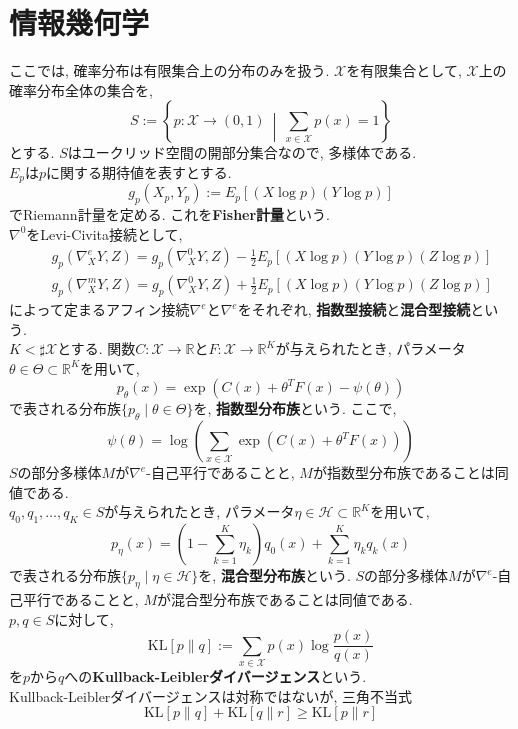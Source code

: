 \documentclass{jarticle}
\theoremstyle{definition}
\begin{document}
\section{情報幾何学}
   ここでは, 確率分布は有限集合上の分布のみを扱う. 
   $\mathcal{X}$を有限集合として, 
   $\mathcal{X}$上の確率分布全体の集合を, 
   \[
   		S:=\left\{ p:\mathcal{X}\to (0,1)\ \middle|\  \sum_{x\in\mathcal{X}}p(x)=1  \right\}
   \]
   とする. $S$はユークリッド空間の開部分集合なので, 多様体である.\\
   $E_p$は$p$に関する期待値を表すとする.
   \[
   		g_p(X_p,Y_p):=E_p[(X \log p)(Y \log p)]	
   \]
   でRiemann計量を定める. これを{\bf Fisher計量}という. \\
   $\nabla^0$をLevi-Civita接続として, 
   \begin{eqnarray*}
   		& & g_p(\nabla_X^e Y,Z)=g_p(\nabla_X^0 Y,Z)-\frac{1}{2}E_p[(X \log p)(Y \log p)(Z \log p)]\\
        & & g_p(\nabla_X^m Y,Z)=g_p(\nabla_X^0 Y,Z)+\frac{1}{2}E_p[(X \log p)(Y \log p)(Z \log p)]
   \end{eqnarray*}
   によって定まるアフィン接続$\nabla^e$と$\nabla^e$をそれぞれ, 
   {\bf 指数型接続}と{\bf 混合型接続}という. \\
   $K<\sharp\mathcal{X}$とする. 
   関数$C:\mathcal{X}\to\mathbb{R}$と$F:\mathcal{X}\to\mathbb{R}^K$が与えられたとき, 
   パラメータ$\theta\in\Theta\subset\mathbb{R}^K$を用いて, 
   \[
   		p_\theta(x) = \exp(C(x)+\theta^T F(x)-\psi(\theta))
   \]
   で表される分布族$\{ p_\theta \mid \theta\in\Theta \}$を, 
   {\bf 指数型分布族}という. ここで, 
   \[
   		\psi(\theta)=\log\left( \sum_{x\in\mathcal{X}} \exp(C(x)+\theta^T F(x)) \right)
   \]
   $S$の部分多様体$M$が$\nabla^e$-自己平行であることと, 
   $M$が指数型分布族であることは同値である.\\
   $q_0,q_1,\dots,q_K \in S$が与えられたとき, 
   パラメータ$\eta\in \mathcal{H}\subset\mathbb{R}^K$を用いて, 
   \[
   		p_\eta(x)=\left( 1-\sum_{k=1}^K \eta_k \right)q_0(x) + \sum_{k=1}^K \eta_k q_k(x)
   \]
   で表される分布族$\{ p_\eta \mid \eta\in\mathcal{H} \}$を, 
   {\bf 混合型分布族}という. 
   $S$の部分多様体$M$が$\nabla^e$-自己平行であることと, 
   $M$が混合型分布族であることは同値である.\\
   $p,q\in S$に対して, 
   \[
   		\text{KL}[p\|q]:=\sum_{x\in\mathcal{X}}p(x)\log\frac{p(x)}{q(x)}
   \]
   を$p$から$q$への{\bf Kullback-Leiblerダイバージェンス}という. \\
   Kullback-Leiblerダイバージェンスは対称ではないが, 三角不当式
   \[
   		\text{KL}[p\|q]+\text{KL}[q\|r]\geq\text{KL}[p\|r]
   \]
\end{document}
